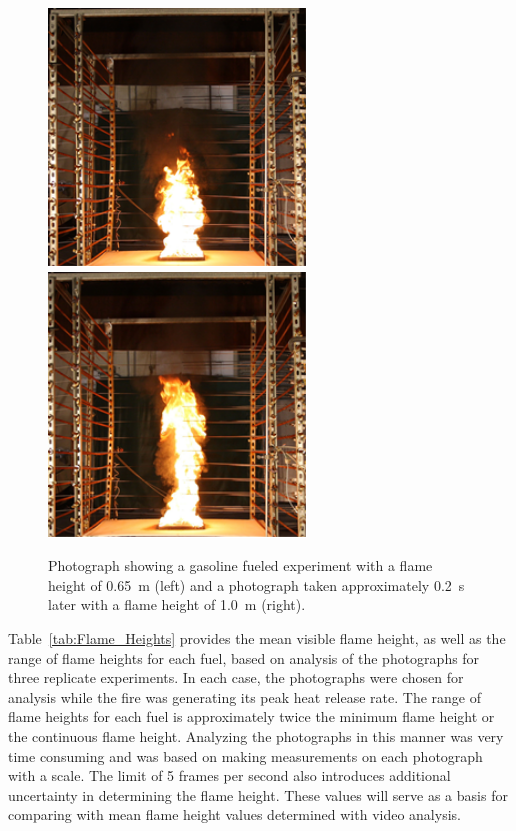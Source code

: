 \documentclass[twoside]{uocthesis}
\begin{document}
{\begin{figure}
  \includegraphics[width=2.7in]{../Figures/Fig15a}
  \includegraphics[width=2.7in]{../Figures/Fig15b} \\
  \caption[Photographs of the gasoline fire]{Photograph showing a gasoline fueled experiment with a flame height of 0.65~m (left) and a photograph taken approximately 0.2~s later with a flame height of 1.0~m (right).}
  \label{Gasoline_Photos}
\end{figure}


Table~\ref{tab:Flame_Heights} provides the mean visible flame height, as well as the range of flame heights for each fuel, based on analysis of the photographs for three replicate experiments.  In each case, the photographs were chosen for analysis while the fire was generating its peak heat release rate.  The range of flame heights for each fuel is approximately twice the minimum flame height or the continuous flame height. Analyzing the photographs in this manner was very time consuming and was based on making measurements on each photograph with a scale.  The limit of 5 frames per second also introduces additional uncertainty in determining the flame height. These values will serve as a basis for comparing with mean flame height values determined with video analysis.

}
\end{document}
